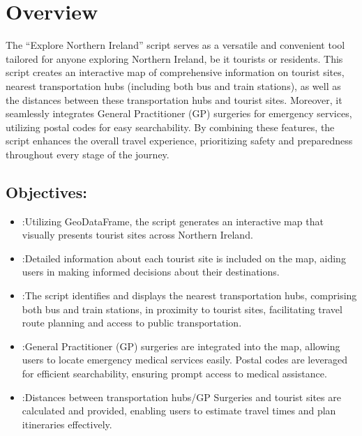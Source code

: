\documentclass[letterpaper,10pt,english]{sphinxmanual}
\begin{document}
\section{Overview}
\label{\detokenize{egm722_serenee/NI_Tourist_Map_doc:overview}}
\sphinxAtStartPar
The “Explore Northern Ireland” script serves as a versatile and convenient tool tailored for anyone exploring Northern Ireland, be it tourists or residents.
This script creates an interactive map of comprehensive information on tourist sites, nearest transportation hubs (including both bus and train stations), as well as the distances between these transportation hubs and tourist sites. Moreover, it seamlessly integrates General Practitioner (GP) surgeries for emergency services, utilizing postal codes for easy searchability. By combining these features, the script enhances the overall travel experience, prioritizing safety and preparedness throughout every stage of the journey.




\subsection{Objectives:}
\label{\detokenize{egm722_serenee/NI_Tourist_Map_doc:objectives}}\begin{itemize}
\item {} 
\sphinxAtStartPar
{}:Utilizing GeoDataFrame, the script generates an interactive map that visually presents tourist sites across Northern Ireland.

\item {} 
\sphinxAtStartPar
{}:Detailed information about each tourist site is included on the map, aiding users in making informed decisions about their destinations.

\item {} 
\sphinxAtStartPar
{}:The script identifies and displays the nearest transportation hubs, comprising both bus and train stations, in proximity to tourist sites, facilitating travel route planning and access to public transportation.

\item {} 
\sphinxAtStartPar
{}:General Practitioner (GP) surgeries are integrated into the map, allowing users to locate emergency medical services easily. Postal codes are leveraged for efficient searchability, ensuring prompt access to medical assistance.

\item {} 
\sphinxAtStartPar
{}:Distances between transportation hubs/GP Surgeries and tourist sites are calculated and provided, enabling users to estimate travel times and plan itineraries effectively.

\end{itemize}
\end{document}
